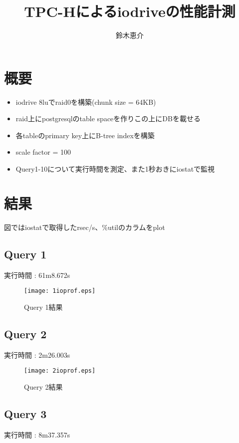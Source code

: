 \documentclass[11pt,a4paper]{jsarticle}
\title{TPC-Hによるiodriveの性能計測}
\author{鈴木恵介}
\begin{document}
\maketitle
\section{概要}
\begin{itemize}
 \item iodrive 8luでraid0を構築(chunk size = 64KB)
 \item raid上にpostgresqlのtable spaceを作りこの上にDBを載せる
 \item 各tableのprimary key上にB-tree indexを構築
 \item scale factor = 100
 \item Query1-10について実行時間を測定、また1秒おきにiostatで監視
\end{itemize}

\section{結果}
図ではiostatで取得したrsec/s、\%utilのカラムをplot

\newpage
\subsection{Query 1}
実行時間 : 61m8.672s

\begin{figure}[thbp]
 \begin{center}
  \texttt{[image: 1ioprof.eps]}
 \end{center}
 \caption{Query 1結果}
 \label{fig:q1}
\end{figure}

\subsection{Query 2}
実行時間 : 2m26.003s

\begin{figure}[thbp]
 \begin{center}
  \texttt{[image: 2ioprof.eps]}
 \end{center}
 \caption{Query 2結果}
 \label{fig:q2}
\end{figure}

\newpage
\subsection{Query 3}
実行時間 : 8m37.357s
\end{document}
